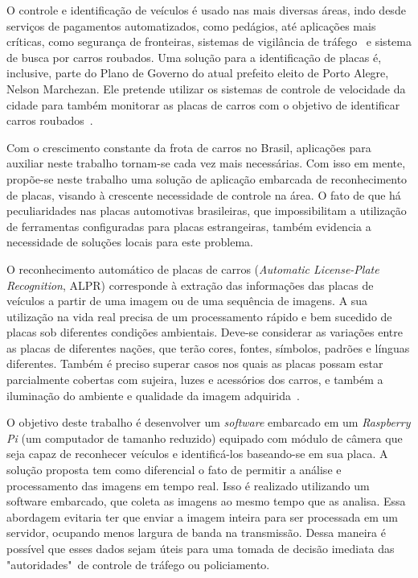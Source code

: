 O controle e identificação de veículos é usado nas mais diversas áreas, indo
desde serviços de pagamentos automatizados, como pedágios, até aplicações mais
críticas, como segurança de fronteiras, sistemas de vigilância de
tráfego~\cite{ahmad2015automatic} e sistema de busca por carros roubados.
Uma solução para a identificação de placas é, inclusive,  parte do Plano de Governo do atual prefeito eleito de Porto Alegre,
Nelson Marchezan. Ele pretende utilizar os sistemas de controle de velocidade da cidade para também
monitorar as placas de carros com o objetivo de identificar carros roubados~\cite{psdb2016marchezan}.

Com o crescimento constante da frota de carros no Brasil, aplicações para
auxiliar neste trabalho tornam-se cada vez
mais necessárias. Com isso em mente, propõe-se neste trabalho uma
solução de aplicação embarcada de reconhecimento de placas, visando
à crescente necessidade de controle na área. O fato de que há
peculiaridades nas placas automotivas
brasileiras, que impossibilitam a utilização de ferramentas configuradas
para placas estrangeiras, também evidencia a necessidade de soluções
locais para este problema.

O reconhecimento automático de placas de carros (\emph{Automatic License-Plate
Recognition}, ALPR) corresponde à extração
das informações das placas de veículos a partir
de uma imagem ou de uma sequência de imagens. A sua utilização na vida real
precisa de um processamento rápido e bem sucedido de placas sob diferentes
condições ambientais. Deve-se considerar as variações entre as placas de
diferentes nações, que terão cores, fontes, símbolos, padrões e línguas
diferentes. Também é preciso superar casos nos quais as placas possam estar
parcialmente cobertas com sujeira, luzes e acessórios dos
carros, e também a iluminação do ambiente e qualidade
da imagem adquirida~\cite{s2013automatic}.

O objetivo deste trabalho é desenvolver um \emph{software} embarcado em um \emph{Raspberry Pi}
(um computador de tamanho reduzido) equipado com módulo de câmera que seja
capaz de reconhecer veículos e identificá-los baseando-se em sua
placa. A solução proposta tem como diferencial o fato de permitir a
análise e processamento das imagens em tempo real. Isso é realizado utilizando um software embarcado, que coleta as imagens ao mesmo tempo
que as analisa. Essa abordagem evitaria ter que enviar a imagem inteira para ser processada em um servidor, ocupando menos largura de banda na transmissão. Dessa maneira é possível que esses dados sejam úteis para uma tomada de decisão imediata das "autoridades"~de controle de tráfego ou policiamento.

